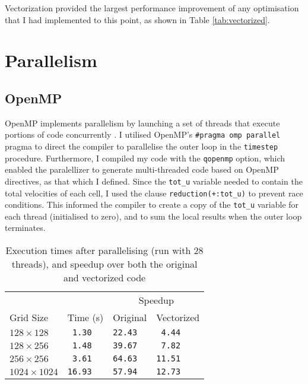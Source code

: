 \documentclass[11pt, twocolumn, a4paper]{article}
\begin{document}
Vectorization provided the largest performance improvement of any optimisation that I had implemented to this point, as shown in Table \ref{tab:vectorized}.

\section{Parallelism}

\subsection{OpenMP}

OpenMP implements parallelism by launching a set of threads that execute portions of code concurrently \cite{openmp_cornell}.
I utilised OpenMP's \texttt{\#pragma omp parallel} pragma to direct the compiler to parallelise the outer loop in the \texttt{timestep} procedure.
Furthermore, I compiled my code with the \texttt{qopenmp} option, which enabled the paralellizer to generate multi-threaded code based on OpenMP directives, as that which I defined.
Since the \texttt{tot\_u} variable needed to contain the total velocities of each cell, I used the clause \texttt{reduction(+:tot\_u)} to prevent race conditions.
This informed the compiler to create a copy of the \texttt{tot\_u} variable for each thread (initialised to zero), and to sum the local results when the outer loop terminates.

\begin{table}[htbp]
  \begin{center}
  \caption{Execution times after parallelising (run with 28 threads), and speedup over both the original and vectorized code}\label{tab:parallelised}
  \begin{tabular}{l | l  l  l} 
      \hline\hline
      &&\multicolumn{2}{c}{Speedup}\\
      \cline{3-4}
      Grid Size&Time (s)&Original&Vectorized\\
      \hline
      $128 \times 128$&\texttt{ 1.30}&\texttt{22.43}&\texttt{ 4.44}\\
      $128 \times 256$&\texttt{ 1.48}&\texttt{39.67}&\texttt{ 7.82}\\
      $256 \times 256$&\texttt{ 3.61}&\texttt{64.63}&\texttt{11.51}\\
      $1024 \times 1024$&\texttt{16.93}&\texttt{57.94}&\texttt{12.73}\\
      \hline
    \end{tabular}
  \end{center}
\end{table}
\end{document}
